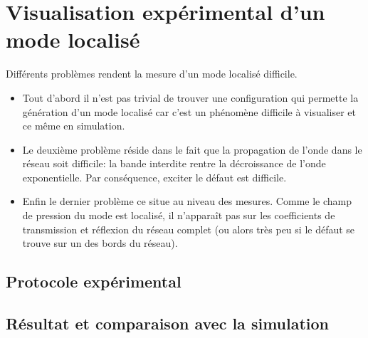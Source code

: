 \chapter{Visualisation expérimental d'un mode localisé}
Différents problèmes rendent la mesure d'un mode localisé difficile.

\begin{itemize}
\item Tout d'abord il n'est pas trivial de trouver une configuration qui permette la génération d'un mode localisé car c'est un phénomène difficile à visualiser et ce même en simulation.

\item Le deuxième problème réside dans le fait que la propagation de l'onde dans le réseau soit difficile: la bande interdite rentre la décroissance de l'onde exponentielle. Par conséquence, exciter le défaut est difficile.

\item Enfin le dernier problème ce situe au niveau des mesures. Comme le champ de pression du mode est localisé, il n’apparaît pas sur les coefficients de transmission et réflexion du réseau complet (ou alors très peu si le défaut se trouve sur un des bords du réseau).
\end{itemize}


\section{Protocole expérimental}
\section{Résultat et comparaison avec la simulation}
